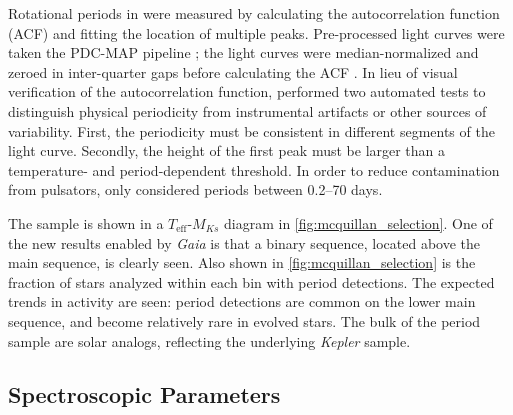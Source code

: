 \documentclass[twocolumn]{aastex6}
\newcommand{\Kepler}{\mbox{\textit{Kepler}}}
\newcommand{\Gaia}{\mbox{\textit{Gaia}}}
\newcommand{\Teff}{\ensuremath{T_{\textrm{eff}}}}
\newcommand{\MK}{\ensuremath{M_{Ks}}}
\begin{document}
Rotational periods in \citet{McQuillan14} were measured by calculating the 
autocorrelation function (ACF) and fitting the location of multiple peaks.
Pre-processed light curves were taken the PDC-MAP pipeline
\citep{Smith12,Stumpe12}; the light curves were median-normalized and zeroed
in inter-quarter gaps before calculating the ACF \citep{McQuillan13}. In
lieu of visual verification of the autocorrelation function, \citet{McQuillan14}
performed two automated tests to distinguish physical periodicity from
instrumental artifacts or other sources of variability. First, the 
periodicity must be consistent in different segments of the light curve.
Secondly, the height of the first peak must be larger than a temperature- and
period-dependent threshold. In order to reduce contamination from pulsators, 
\citet{McQuillan14} only considered periods between 0.2--70 days.

\begin{figure*}[htb]
    \centering
    \caption{\emph{Left:} \Teff{}-\MK{} density plot of the sample of
        \citet{McQuillan14} period detections. Color represents the number of
        objects in each bin. A binary sequence is clearly 
        visible above the lower main sequence. Temperatures are from
        \citet{Pinsonneault12}. The bin size is 100 K in
        temperature and 0.02 mag in \(Ks\)-band absolute magnitude. A 
        representative error bar is shown on the bottom left corner, although
        the vertical error bar is too small to be easily visible. A 
        solar-metallicity 1~Gyr MIST isochrone is displayed in pink. 
        \emph{Right:} The variation in the \citet{McQuillan14} period 
        detection fraction across the \Teff-\MK{} 
    diagram.}\label{fig:mcquillan_selection}
\end{figure*}

The \citet{McQuillan14} sample is shown in a \Teff-\MK{}
diagram in \cref{fig:mcquillan_selection}. One of the new results enabled by 
\Gaia{} is that a binary sequence,
located above the main sequence, is clearly seen. Also shown in
\cref{fig:mcquillan_selection} is the fraction of stars analyzed within each
bin with period detections. The expected trends in activity are seen: period 
detections are common on the lower main sequence, and become relatively rare 
in evolved stars. The bulk of the period sample are solar analogs, reflecting 
the underlying \Kepler{} sample.

\subsection{Spectroscopic Parameters}
\end{document}
